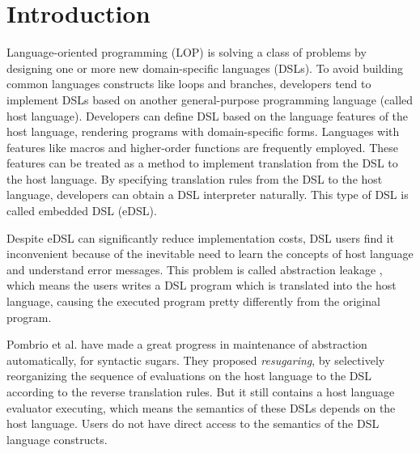 \section{Introduction}

Language-oriented programming (LOP) \cite{LOP} is solving a class of problems by designing one or more new domain-specific languages (DSLs).
To avoid building common languages constructs like loops and branches,
developers tend to implement DSLs based on another general-purpose programming language (called host language).
Developers can define DSL based on the language features of the host language, rendering programs with domain-specific forms.
Languages with features like macros and higher-order functions are frequently employed\cite{macro-dsl,macro-dsl-2}.
These features can be treated as a method to implement translation from the DSL to the host language.
By specifying translation rules from the DSL to the host language, developers can obtain a DSL interpreter naturally.
This type of DSL is called embedded DSL (eDSL).

Despite eDSL can significantly reduce implementation costs, DSL users find it inconvenient because of the inevitable need to learn the concepts of host language and understand error messages.
This problem is called abstraction leakage \cite{Abstraction},
 which means the users writes a DSL program which is translated into the host language,
 causing the executed program pretty differently from the original program.


Pombrio et al. \cite{resugar} have made a great progress in maintenance of abstraction automatically, for syntactic sugars.
They proposed \textit{resugaring}, by selectively reorganizing the sequence of evaluations on the host language to the DSL according to the reverse translation rules.
But it still contains a host language evaluator executing,
 which means the semantics of these DSLs depends on the host language.
Users do not have direct access to the semantics of the DSL language constructs.



